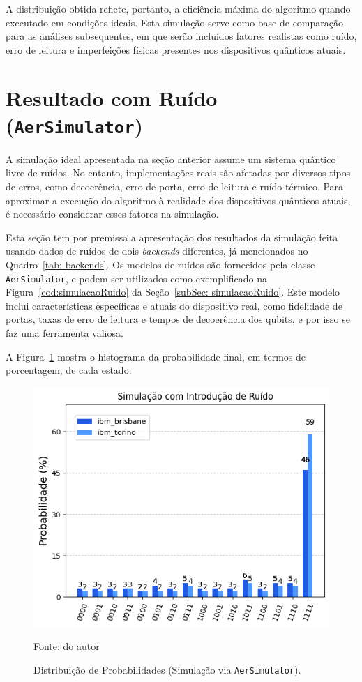 A distribuição obtida reflete, portanto, a eficiência máxima do algoritmo quando executado em condições ideais. Esta simulação serve como base de comparação para as análises subsequentes, em que serão incluídos fatores realistas como ruído, erro de leitura e imperfeições físicas presentes nos dispositivos quânticos atuais.

\section{Resultado com Ruído (\texttt{AerSimulator})}
\label{sec: resultRuido}

A simulação ideal apresentada na seção anterior assume um sistema quântico livre de ruídos. No entanto, implementações reais são afetadas por diversos tipos de erros, como decoerência, erro de porta, erro de leitura e ruído térmico. Para aproximar a execução do algoritmo à realidade dos dispositivos quânticos atuais, é necessário considerar esses fatores na simulação.

Esta seção tem por premissa a apresentação dos resultados da simulação feita usando dados de ruídos de dois \textit{backends} diferentes, já mencionados no Quadro~\ref{tab: backends}. Os modelos de ruídos são fornecidos pela classe \texttt{AerSimulator}, e podem ser utilizados como exemplificado na Figura~\ref{cod:simulacaoRuido} da Seção~\ref{subSec: simulacaoRuido}. Este modelo inclui características específicas e atuais do dispositivo real, como fidelidade de portas, taxas de erro de leitura e tempos de decoerência dos qubits, e por isso se faz uma ferramenta valiosa.

A Figura~\ref{fig:resultRuido} mostra o histograma da probabilidade final, em termos de porcentagem, de cada estado.

\begin{figure}[ht!]
    \centering
    \captionsetup{justification=centering}
    \caption{Distribuição de Probabilidades (Simulação via \texttt{AerSimulator}).}
    \label{fig:resultRuido}
    \includegraphics[width=.5\linewidth]{Imagens/resultRuido.png}    
    
    {\small Fonte: do autor} 
\end{figure}

